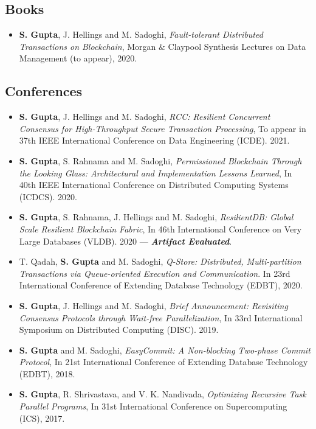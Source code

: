 \documentclass[10pt]{article}
\begin{document}
\subsection*{Books}
\begin{itemize}
\itemsep-0.2em

\item {\bf S. Gupta}, J. Hellings and M. Sadoghi, {\em Fault-tolerant Distributed Transactions on Blockchain}, Morgan $\&$ Claypool Synthesis Lectures on Data Management (to appear), 2020.

\end{itemize}


\subsection*{Conferences}
\begin{itemize}
\itemsep-0.2em

\item {\bf S. Gupta}, J. Hellings and M. Sadoghi, {\em RCC: Resilient Concurrent Consensus for High-Throughput Secure Transaction Processing}, To appear in 37th IEEE International Conference on Data Engineering (ICDE). 2021.

\item {\bf S. Gupta}, S. Rahnama and M. Sadoghi, {\em Permissioned Blockchain Through the Looking Glass: Architectural and Implementation Lessons Learned}, In 40th IEEE International Conference on Distributed Computing Systems (ICDCS). 2020.

\item {\bf S. Gupta}, S. Rahnama, J. Hellings and M. Sadoghi, {\em ResilientDB: Global Scale Resilient Blockchain Fabric}, In 46th International Conference on Very Large Databases (VLDB). 2020 --- {\bf \em Artifact Evaluated}.

\item T. Qadah, {\bf S. Gupta} and M. Sadoghi, {\em Q-Store: Distributed, Multi-partition Transactions via Queue-oriented Execution and Communication}. In 23rd International Conference of Extending Database Technology (EDBT), 2020.

\item {\bf S. Gupta}, J. Hellings and M. Sadoghi, {\em Brief Announcement: Revisiting Consensus Protocols through Wait-free Parallelization}, In 33rd International Symposium on Distributed Computing (DISC). 2019.

\item {\bf S. Gupta} and M. Sadoghi, {\em EasyCommit: A Non-blocking Two-phase Commit Protocol}, In 21st International Conference of Extending Database Technology (EDBT), 2018.

\item {\bf S. Gupta}, R. Shrivastava, and V. K. Nandivada, {\em Optimizing Recursive Task Parallel Programs}, In 31st International Conference on Supercomputing (ICS), 2017.
\end{itemize}
\end{document}
